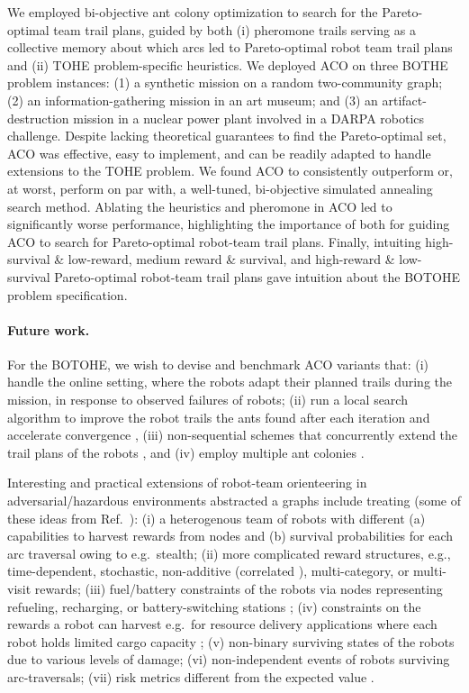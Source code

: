 \documentclass[fleqn,10pt,lineno]{wlpeerj}
\begin{document}
We employed bi-objective ant colony optimization to search for the Pareto-optimal team trail plans, guided by both (i) pheromone trails serving as a collective memory about which arcs led to Pareto-optimal robot team trail plans and (ii) TOHE problem-specific heuristics. We deployed ACO on three BOTHE problem instances: (1) a synthetic mission on a random two-community graph; (2) an information-gathering mission in an art museum; and (3) an artifact-destruction mission in a nuclear power plant involved in a DARPA robotics challenge.
Despite lacking theoretical guarantees to find the Pareto-optimal set, ACO was effective, easy to implement, and can be readily adapted to handle extensions to the TOHE problem. 
We found ACO to consistently outperform or, at worst, perform on par with, a well-tuned, bi-objective simulated annealing search method. 
Ablating the heuristics and pheromone in ACO led to significantly worse performance, highlighting the importance of both for guiding ACO to search for Pareto-optimal robot-team trail plans. Finally, intuiting high-survival \& low-reward, medium reward \& survival, and high-reward \& low-survival Pareto-optimal robot-team trail plans gave intuition about the BOTOHE problem specification.

\paragraph{Future work.}
For the BOTOHE, we wish to devise and benchmark ACO variants that:
(i) handle the online setting, where the robots adapt their planned trails during the mission, in response to observed failures of robots; 
(ii) run a local search algorithm to improve the robot trails the ants found after each iteration and accelerate convergence \cite{dorigo2006ant}, 
(iii) non-sequential schemes that concurrently extend the trail plans of the robots \cite{ke2008ants}, and 
(iv) employ multiple ant colonies \cite{iredi2001bi}.

Interesting and practical extensions of robot-team orienteering in adversarial/hazardous environments abstracted a graphs include treating (some of these ideas from Ref.~\cite{jorgensen2018team}): 
(i) a heterogenous team of robots with different (a) capabilities to harvest rewards from nodes and (b) survival probabilities for each arc traversal owing to e.g.\ stealth;
(ii) more complicated reward structures, e.g., time-dependent, stochastic, non-additive (correlated \cite{yu2014correlated}), multi-category, or multi-visit rewards;
(iii) fuel/battery constraints of the robots via nodes representing refueling, recharging, or battery-switching stations \cite{asghar2023risk,khuller2011fill,liao2016electric,yu2019coverage}; 
(iv) constraints on the rewards a robot can harvest e.g.\ for resource delivery applications where each robot holds limited cargo capacity \cite{coelho2014thirty};
(v) non-binary surviving states of the robots due to various levels of damage;
(vi) non-independent events of robots surviving arc-traversals;
(vii) risk metrics different from the expected value \cite{majumdar2020should}.
\end{document}
